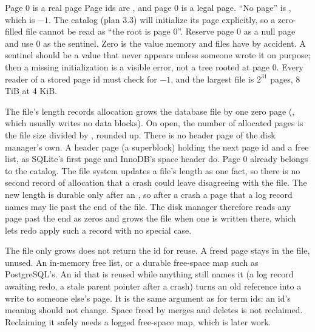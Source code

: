 \begin{decision}{Page 0 is a real page}
 Page ids are , and page 0 is a legal page.
``No page'' is , which is $-1$. The catalog (plan 3.3) will
initialize its page explicitly, so a zero-filled file cannot be read as ``the root is page
0''.
 Reserve page 0 as a null page and use 0 as the sentinel.
 Zero is the value memory and files have by accident. A sentinel
should be a value that never appears unless someone wrote it on purpose; then a
missing initialization is a visible error, not a tree rooted at page 0.
 Every reader of a stored page id must check for $-1$, and the
largest file is $2^{31}$ pages, 8 TiB at 4 KiB.
\end{decision}

\begin{decision}{The file's length records allocation}
  grows the database file by one zero page
(, which usually writes no data blocks). On open, the number of
allocated pages is the file size divided by , rounded up. There
is no header page of the disk manager's own.
 A header page (a superblock) holding the next page id and
a free list, as SQLite's first page and InnoDB's space header do.
 Page 0 already belongs to the catalog. The file system updates a
file's length as one fact, so there is no second record of allocation that a
crash could leave disagreeing with the file.
 The new length is durable only after an , so after a
crash a page that a log record names may lie past the end of the file. The disk
manager therefore reads any page past the end as zeros and grows the file when
one is written there, which lets redo apply such a record with no special case.
\end{decision}

\begin{decision}{The file only grows}
  does not return the id for reuse. A freed
page stays in the file, unused.
 An in-memory free list, or a durable free-space map such
as PostgreSQL's.
 An id that is reused while anything still names it (a log record
awaiting redo, a stale parent pointer after a crash) turns an old reference
into a write to someone else's page. It is the same argument as for term ids:
an id's meaning should not change.
 Space freed by merges and deletes is not reclaimed. Reclaiming it
safely needs a logged free-space map, which is later work.
\end{decision}

